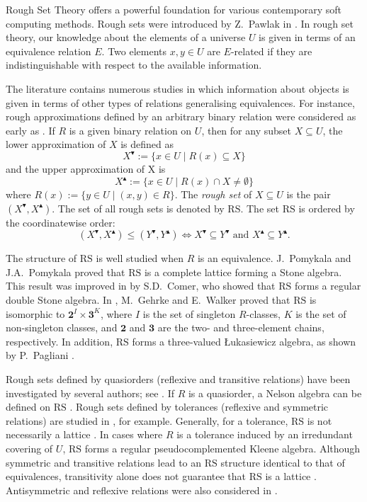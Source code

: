 \documentclass[11pt,a4paper]{amsart}
\newcommand{\UP}{\blacktriangle}
\newcommand{\DOWN}{\blacktriangledown}
\theoremstyle{plain}
\theoremstyle{definition}
\theoremstyle{remark}
\numberwithin{equation}{section}
\begin{document}
Rough Set Theory offers a powerful foundation for various contemporary soft computing methods.
Rough sets were introduced by Z.~Pawlak in \cite{Pawl82}. 
In rough set theory, our knowledge about the elements of a 
universe $U$ is given in terms of an equivalence relation $E$. 
Two elements $x,y \in U$ are $E$-related if they are indistinguishable with respect to the available information.

The literature contains numerous studies in which 
information about objects is given in terms of other types 
of relations generalising equivalences. For instance, rough approximations defined by an arbitrary  binary relation were considered as early as \cite{Yao96}. 
If $R$ is a given binary relation on $U$, then for any 
subset $X \subseteq U$, the lower
approximation of $X$ is defined as
\[ X^\DOWN := \{x \in U \mid R(x) \subseteq X \} \]
and the upper approximation of X is
\[ X^\UP := \{x \in U \mid R(x) \cap X \neq \emptyset\} \]
where $R(x) := \{y \in U \mid (x,y) \in R \}$.
The \emph{rough set} of $X \subseteq U$ is the pair 
$(X^\DOWN,X^\UP)$. The set of all rough sets is denoted
by $\mathrm{RS}$. The set $\mathrm{RS}$ is ordered by the coordinatewise order:
\begin{equation*}
(X^\DOWN,X^\UP)\leq (Y^\DOWN,Y^\UP) \iff 
X^\DOWN\subseteq Y^\DOWN \text{ and } X^\UP\subseteq Y^\UP.
\end{equation*}

The structure of $\mathrm{RS}$ is well studied when
$R$ is an equivalence. J.~Pomykala and {J.A.}~Pomykala 
\cite{PomPom88} proved that $\mathrm{RS}$ is a complete lattice 
forming a Stone algebra. This result was improved in \cite{Comer93} 
by {S.D.}~Comer, who showed that $\mathrm{RS}$ forms a regular double 
Stone algebra. In \cite{GeWa92}, M.~Gehrke and E.~Walker proved that 
$\mathrm{RS}$ is isomorphic to 
$\mathbf{2}^I \times \mathbf{3}^K$, where $I$ is the set of singleton 
$R$-classes, $K$ is the set of non-singleton classes, and 
$\mathbf{2}$ and
$\mathbf{3}$ are the two- and three-element chains, respectively.
In addition, $\mathrm{RS}$ forms a three-valued {\L}ukasiewicz
algebra, as shown by P.~Pagliani \cite{Pagl97}.

Rough sets defined by quasiorders (reflexive and transitive relations) have been investigated by several authors; see 
\cite{Ganter07, JarvRadeRivi24, Kortelainen1994, 
KumBan2015,  Umadevi13, Qiao2012}. If $R$ is a quasiorder,
a Nelson algebra can be defined on $\mathrm{RS}$ \cite{JarRad11}.
Rough sets defined by tolerances (reflexive and symmetric relations)
are studied in \cite{Jarvinen01, JarRad14,SkowStep96, SlowVand00}, 
for example. Generally, for a tolerance, $\mathrm{RS}$ is not 
necessarily a lattice \cite{Jarvinen01}.
In cases where $R$ is a tolerance induced by an irredundant covering 
of $U$, $\mathrm{RS}$ forms a regular pseudocomplemented Kleene
algebra. Although symmetric and transitive relations lead to an $\mathrm{RS}$ structure identical to that of equivalences, 
transitivity alone does not guarantee that $\mathrm{RS}$ is a lattice \cite{Jarv04}. 
Antisymmetric and reflexive relations were also considered  in \cite[Theorem~25]{ManRad20}.
\end{document}
